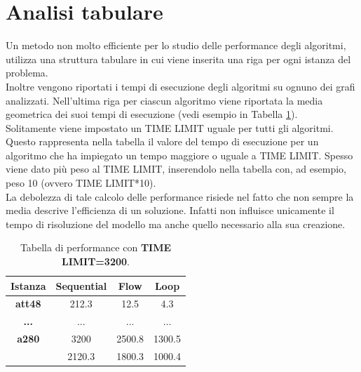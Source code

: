 \section{Analisi tabulare}
Un metodo non molto efficiente per lo studio delle performance degli algoritmi, utilizza una struttura tabulare in cui viene inserita una riga per ogni istanza del problema.\\ Inoltre vengono riportati i tempi di esecuzione degli algoritmi su ognuno dei grafi analizzati. Nell'ultima riga per ciascun algoritmo viene riportata la media geometrica dei suoi tempi di esecuzione (vedi esempio in Tabella \ref{result_table}).\\
Solitamente viene impostato un TIME LIMIT uguale per tutti gli algoritmi. Questo rappresenta nella tabella il valore del tempo di esecuzione per un algoritmo che ha impiegato un tempo maggiore o uguale a TIME LIMIT. Spesso viene dato più peso al TIME LIMIT, inserendolo nella tabella con, ad esempio, peso 10 (ovvero TIME LIMIT*10).\\ La debolezza di tale calcolo delle performance risiede nel fatto che non sempre la media descrive  l'efficienza di un soluzione. Infatti non influisce unicamente il tempo di risoluzione del modello ma anche quello necessario alla sua creazione. 

\begin{table}[h]
\centering
\begin{tabular}{|c|c|c|c|}
\multicolumn{1}{c}{\textbf{Istanza}} & \multicolumn{1}{c}{\textbf{Sequential}} & \multicolumn{1}{c}{\textbf{Flow}} &
\multicolumn{1}{c}{\textbf{Loop}}\\
\hline
\textbf{att48} & {212.3} & {12.5} & {4.3}\\
\hline
{\textbf{...}} & {...} & {...} & {...}\\
\hline
\textbf{a280} & {3200} & {2500.8} & {1300.5}\\
\hline
\hline
\multicolumn{1}{c}{} & \multicolumn{1}{c}{2120.3} & \multicolumn{1}{c}{1800.3}& \multicolumn{1}{c}{1000.4}\\
\end{tabular}
\caption{\footnotesize{Tabella di performance con \textbf{TIME LIMIT=3200}.}}\label{result_table}
\end{table}

